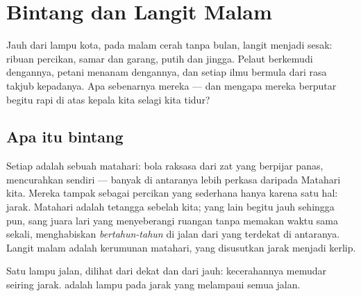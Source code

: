 \chapter{Bintang dan Langit Malam}\label{ch:g5:stars-night-sky}

Jauh dari lampu kota, pada malam cerah tanpa bulan, langit menjadi
sesak: ribuan percikan, samar dan garang, putih dan jingga. Pelaut
berkemudi dengannya, petani menanam dengannya, dan setiap ilmu bermula
dari rasa takjub kepadanya. Apa sebenarnya mereka --- dan mengapa
mereka berputar begitu rapi di atas kepala kita selagi kita tidur?

\section{Apa itu bintang}

\begin{example}\label{ex:g5:stars-night-sky:suns}
Setiap  adalah sebuah matahari: bola raksasa dari zat yang
berpijar panas, mencurahkan  sendiri --- banyak di antaranya
lebih perkasa daripada Matahari kita. Mereka tampak sebagai percikan
yang sederhana hanya karena satu hal: jarak. Matahari adalah 
tetangga sebelah kita; yang lain begitu jauh sehingga  pun, sang
juara lari yang menyeberangi ruangan tanpa memakan waktu sama sekali,
menghabiskan \emph{bertahun-tahun} di jalan dari yang terdekat di
antaranya. Langit malam adalah kerumunan matahari, yang disusutkan
jarak menjadi kerlip.
\end{example}

\begin{omfigure}

{\small Satu lampu jalan, dilihat dari dekat dan dari jauh:
kecerahannya memudar seiring jarak.  adalah lampu pada jarak
yang melampaui semua jalan.}
\end{omfigure}


